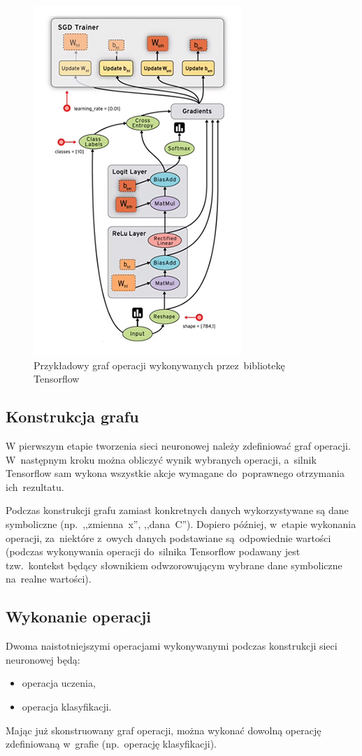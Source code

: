 \begin{figure}[H]
	\centering
	\includegraphics[width=0.5\linewidth]{img/tf-sample-graph.jpg}
	\caption{Przykładowy graf operacji wykonywanych przez~bibliotekę Tensorflow}
	\label{img:tf-smpl-grf}
\end{figure}

\subsection{Konstrukcja grafu}
W pierwszym etapie tworzenia sieci neuronowej należy zdefiniować graf operacji. W~następnym kroku można obliczyć
wynik wybranych operacji, a~silnik Tensorflow sam wykona wszystkie akcje wymagane do~poprawnego otrzymania
ich~rezultatu.

Podczas konstrukcji grafu zamiast konkretnych danych wykorzystywane są dane symboliczne (np.~,,zmienna~x'',
,,dana~C''). Dopiero później, w~etapie wykonania operacji, za~niektóre z~owych danych podstawiane
są~odpowiednie wartości (podczas wykonywania operacji do~silnika Tensorflow podawany jest tzw.~kontekst będący
słownikiem odwzorowującym wybrane dane symboliczne na~realne wartości).


\subsection{Wykonanie operacji}
Dwoma naistotniejszymi operacjami wykonywanymi podczas konstrukcji sieci neuronowej będą:
\begin{itemize}
    \item operacja uczenia,
    \item operacja klasyfikacji.
\end{itemize}

Mając już skonstruowany graf operacji, można wykonać dowolną operację zdefiniowaną w~grafie (np.~operację klasyfikacji).

